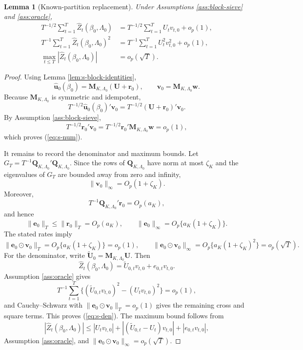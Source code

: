 \documentclass[10pt]{book}
\numberwithin{equation}{section}
\newtheorem{lemma}{Lemma}
\theoremstyle{definition}
\begin{document}
\begin{lemma}[Known-partition replacement]
\label{lem:s-known-replacement}
Under Assumptions \ref*{ass:block-sieve} and \ref*{ass:oracle},
\begin{align}
    T^{-1/2}\sum_{t=1}^T\widehat Z_t(\beta_0,\Lambda_0)
    &=T^{-1/2}\sum_{t=1}^T U_tv_{t,0}+o_p(1),
    \label{eq:s-num}\\
    T^{-1}\sum_{t=1}^T\widehat Z_t(\beta_0,\Lambda_0)^2
    &=T^{-1}\sum_{t=1}^T U_t^2v_{t,0}^2+o_p(1),
    \label{eq:s-den}\\
    \max_{t\leq T}|\widehat Z_t(\beta_0,\Lambda_0)|&=o_p(\sqrt T).
    \label{eq:s-max}
\end{align}
\end{lemma}

\begin{proof}
Using Lemma \ref{lem:s-block-identities},
\[
    \widehat{\bm u}_0(\beta_0)
    =
    \bm M_{K,\Lambda_0}(\bm U+\bm r_0),
    \qquad
    \bm v_0=\bm M_{K,\Lambda_0}\bm w.
\]
Because \(\bm M_{K,\Lambda_0}\) is symmetric and idempotent,
\[
    T^{-1/2}\widehat{\bm u}_0(\beta_0)'\bm v_0
    =
    T^{-1/2}(\bm U+\bm r_0)'\bm v_0.
\]
By Assumption \ref*{ass:block-sieve},
\[
    T^{-1/2}\bm r_0'\bm v_0
    =
    T^{-1/2}\bm r_0'\bm M_{K,\Lambda_0}\bm w
    =o_p(1),
\]
which proves (\ref{eq:s-num}).

It remains to record the denominator and maximum bounds. Let \(G_T=T^{-1}\bm Q_{K,\Lambda_0}'\bm Q_{K,\Lambda_0}\). Since the rows of \(\bm Q_{K,\Lambda_0}\) have norm at most \(\zeta_K\) and the eigenvalues of \(G_T\) are bounded away from zero and infinity,
\[
    \|\bm v_0\|_\infty=O_p(1+\zeta_K).
\]
Moreover,
\[
    T^{-1}\bm Q_{K,\Lambda_0}'\bm r_0=O_p(a_K),
\]
and hence
\[
    \|\bm e_0\|_T\leq\|\bm r_0\|_T=O_p(a_K),
    \qquad
    \|\bm e_0\|_\infty=O_p\{a_K(1+\zeta_K)\}.
\]
The stated rates imply
\[
    \|\bm e_0\odot\bm v_0\|_T
    =O_p\{a_K(1+\zeta_K)\}=o_p(1),
    \qquad
    \|\bm e_0\odot\bm v_0\|_\infty
    =O_p\{a_K(1+\zeta_K)^2\}=o_p(\sqrt T).
\]
For the denominator, write \(\widetilde{\bm U}_0=\bm M_{K,\Lambda_0}\bm U\). Then
\[
    \widehat Z_t(\beta_0,\Lambda_0)
    =
    \widetilde U_{0,t}v_{t,0}+e_{0,t}v_{t,0}.
\]
Assumption \ref*{ass:oracle} gives
\[
    T^{-1}\sum_{t=1}^T
    \{(\widetilde U_{0,t}v_{t,0})^2-(U_tv_{t,0})^2\}=o_p(1),
\]
and Cauchy--Schwarz with \(\|\bm e_0\odot\bm v_0\|_T=o_p(1)\) gives the remaining cross and square terms. This proves (\ref{eq:s-den}). The maximum bound follows from
\[
    |\widehat Z_t(\beta_0,\Lambda_0)|
    \leq
    |U_tv_{t,0}|
    +
    |(\widetilde U_{0,t}-U_t)v_{t,0}|
    +
    |e_{0,t}v_{t,0}|,
\]
Assumption \ref*{ass:oracle}, and \(\|\bm e_0\odot\bm v_0\|_\infty=o_p(\sqrt T)\).
\end{proof}
\end{document}
